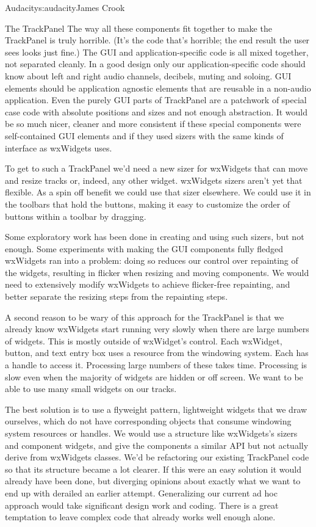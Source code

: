 \begin{aosachapter}{Audacity}{s:audacity}{James Crook}
\begin{aosasect1}{The TrackPanel}
The way all these components fit together to make the TrackPanel is
truly horrible.  (It's the code that's horrible; the end result the
user sees looks just fine.)  The GUI and application-specific code is
all mixed together, not separated cleanly.  In a good design only our
application-specific code should know about left and right audio
channels, decibels, muting and soloing.  GUI elements should be
application agnostic elements that are reusable in a non-audio
application.  Even the purely GUI parts of TrackPanel are a patchwork
of special case code with absolute positions and sizes and not enough
abstraction.  It would be so much nicer, cleaner and more consistent
if these special components were self-contained GUI elements and if
they used sizers with the same kinds of interface as wxWidgets uses.

To get to such a TrackPanel we'd need a new sizer for wxWidgets that
can move and resize tracks or, indeed, any other widget.  wxWidgets
sizers aren't yet that flexible.  As a spin off benefit we could use
that sizer elsewhere.  We could use it in the toolbars that hold the
buttons, making it easy to customize the order of buttons within a
toolbar by dragging.

Some exploratory work has been done in creating and using such sizers,
but not enough.  Some experiments with making the GUI components fully
fledged wxWidgets ran into a problem: doing so reduces our control
over repainting of the widgets, resulting in flicker when resizing and
moving components.  We would need to
extensively modify wxWidgets to achieve flicker-free repainting, and
better separate the resizing steps from the repainting steps.

A second reason to be wary of this approach for the TrackPanel is that
we already know wxWidgets start running very slowly when there are
large numbers of widgets.  This is mostly outside of wxWidget's
control.  Each wxWidget, button, and text entry box uses a
resource from the windowing system. Each has a handle to access it.
Processing large numbers of these takes time.  Processing is slow even
when the majority of widgets are hidden or off screen.  We want to be
able to use many small widgets on our tracks.

The best solution is to use a flyweight pattern, lightweight
widgets that we draw ourselves, which do not have corresponding
objects that consume windowing system resources or handles.  We would
use a structure like wxWidgets's sizers and component widgets, and
give the components a similar API but not actually derive from
wxWidgets classes.  We'd be refactoring our existing TrackPanel code
so that its structure became a lot clearer.  If this were an easy
solution it would already have been done, but diverging opinions about
exactly what we want to end up with derailed an earlier attempt.
Generalizing our current ad hoc approach would take significant design
work and coding.  There is a great temptation to leave complex code
that already works well enough alone.


\end{aosasect1}
\end{aosachapter}
